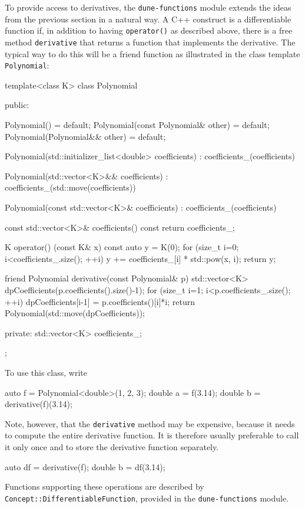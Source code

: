 \documentclass[11pt,
                 numbers=noenddot,
                 headings=normal,
                 DIV16, BCOR10mm]{scrartcl}
\newcommand{\cpp}{\lstinline}
\theoremstyle{remark}
\newcommand{\dunemodule}[1]{\texttt{#1}}
\begin{document}
To provide access to derivatives, the \dunemodule{dune-functions} module extends the ideas from the previous section
in a natural way.  A C++ construct is a differentiable function
if, in addition to having \cpp{operator()} as described above, there is a free method \cpp{derivative} that returns a function
that implements the derivative.  The typical way to do this will be a friend function as illustrated in the class template
\cpp{Polynomial}:
\begin{c++}
template<class K>
class Polynomial
{
public:

  Polynomial() = default;
  Polynomial(const Polynomial& other) = default;
  Polynomial(Polynomial&& other) = default;

  Polynomial(std::initializer_list<double> coefficients) :
    coefficients_(coefficients) {}

  Polynomial(std::vector<K>&& coefficients) :
      coefficients_(std::move(coefficients)) {}

  Polynomial(const std::vector<K>& coefficients) :
    coefficients_(coefficients) {}

  const std::vector<K>& coefficients() const
  { return coefficients_; }

  K operator() (const K& x) const
  {
    auto y = K(0);
    for (size_t i=0; i<coefficients_.size(); ++i)
      y += coefficients_[i] * std::pow(x, i);
    return y;
  }

  friend Polynomial derivative(const Polynomial& p)
  {
    std::vector<K> dpCoefficients(p.coefficients().size()-1);
    for (size_t i=1; i<p.coefficients_.size(); ++i)
      dpCoefficients[i-1] = p.coefficients()[i]*i;
    return Polynomial(std::move(dpCoefficients));
  }

private:
  std::vector<K> coefficients_;
};
\end{c++}

To use this class, write
\begin{c++}
auto f = Polynomial<double>({1, 2, 3});
double a = f(3.14);
double b = derivative(f)(3.14);
\end{c++}
Note, however, that the \cpp{derivative} method may be expensive, because it needs to compute the entire derivative function.
It is therefore usually preferable to call it only once and to store the derivative function separately.
\begin{c++}
auto df = derivative(f);
double b = df(3.14);
\end{c++}
Functions supporting these operations are described by \cpp{Concept::DifferentiableFunction},
provided in the \dunemodule{dune-functions} module.
\end{document}
